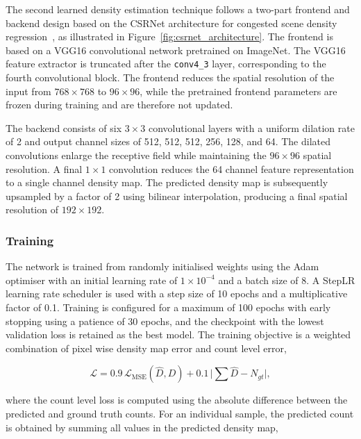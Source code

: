The second learned density estimation technique follows a two-part frontend and backend design based on the CSRNet architecture for congested scene density regression~\cite{li2018csrnet}, as illustrated in Figure~\ref{fig:csrnet_architecture}. The frontend is based on a VGG16 convolutional network pretrained on ImageNet. The VGG16 feature extractor is truncated after the \texttt{conv4\_3} layer, corresponding to the fourth convolutional block. The frontend reduces the spatial resolution of the input from $768 \times 768$ to $96 \times 96$, while the pretrained frontend parameters are frozen during training and are therefore not updated.

The backend consists of six $3{\times}3$ convolutional layers with a uniform dilation rate of 2 and output channel sizes of 512, 512, 512, 256, 128, and 64. The dilated convolutions enlarge the receptive field while maintaining the $96{\times}96$ spatial resolution. A final $1{\times}1$ convolution reduces the 64 channel feature representation to a single channel density map. The predicted density map is subsequently upsampled by a factor of 2 using bilinear interpolation, producing a final spatial resolution of $192{\times}192$.

\subsubsection{Training}

The network is trained from randomly initialised weights using the Adam optimiser with an initial learning rate of $1\times10^{-4}$ and a batch size of 8. A StepLR learning rate scheduler is used with a step size of 10 epochs and a multiplicative factor of 0.1. Training is configured for a maximum of 100 epochs with early stopping using a patience of 30 epochs, and the checkpoint with the lowest validation loss is retained as the best model. The training objective is a weighted combination of pixel wise density map error and count level error,

\begin{equation}
	\mathcal{L} = 0.9 \, \mathcal{L}_{\text{MSE}}(\hat D, D) + 0.1 \, \bigl|{\textstyle\sum}\hat D - N_{gt}\bigr|,
\end{equation}

where the count level loss is computed using the absolute difference between the predicted and ground truth counts. For an individual sample, the predicted count is obtained by summing all values in the predicted density map,


